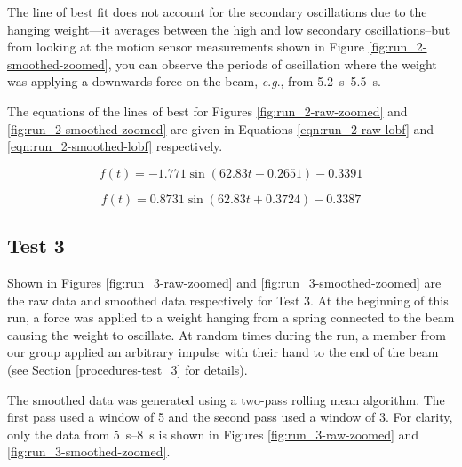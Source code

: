 \documentclass[12 pt]{report}
\newcommand{\eg}{\textit{e}.\textit{g}., }
\begin{document}
The line of best fit does not account for the secondary oscillations due to the hanging weight---it averages between the high and low secondary oscillations--but from looking at the motion sensor measurements shown in Figure \ref{fig:run_2-smoothed-zoomed}, you can observe the periods of oscillation where the weight was applying a downwards force on the beam, \eg from \qtyrange{5.2}{5.5}{\s}.

The equations of the lines of best for Figures \ref{fig:run_2-raw-zoomed} and \ref{fig:run_2-smoothed-zoomed} are given in Equations \ref{eqn:run_2-raw-lobf} and \ref{eqn:run_2-smoothed-lobf} respectively.

\begin{equation} \label{eqn:run_2-raw-lobf}
f(t)=-1.771\sin(62.83t-0.2651)-0.3391
\end{equation}

\begin{equation} \label{eqn:run_2-smoothed-lobf}
f(t)=0.8731\sin(62.83t+0.3724)-0.3387
\end{equation}

\subsection{Test 3} \label{data-test_3}
Shown in Figures \ref{fig:run_3-raw-zoomed} and \ref{fig:run_3-smoothed-zoomed} are the raw data and smoothed data respectively for Test \num{3}. At the beginning of this run, a force was applied to a weight hanging from a spring connected to the beam causing the weight to oscillate. At random times during the run, a member from our group applied an arbitrary impulse with their hand to the end of the beam (see Section \ref{procedures-test_3} for details).

The smoothed data was generated using a two-pass rolling mean algorithm. The first pass used a window of \num{5} and the second pass used a window of \num{3}. For clarity, only the data from \qtyrange{5}{8}{\s} is shown in Figures \ref{fig:run_3-raw-zoomed} and \ref{fig:run_3-smoothed-zoomed}.
\end{document}
